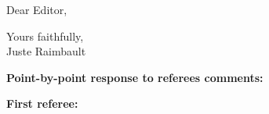 \documentclass[11pt,a4paper,sans]{moderncv}        %
\begin{document}
\date{\today}
\opening{Dear Editor,}
\closing{Yours faithfully,\\
Juste Raimbault%
}

\makelettertitle



\justify





\bigskip




\bigskip


\medskip
\textbf{Point-by-point response to referees comments:}

\medskip

\textbf{First referee:}

\medskip

\end{document}
